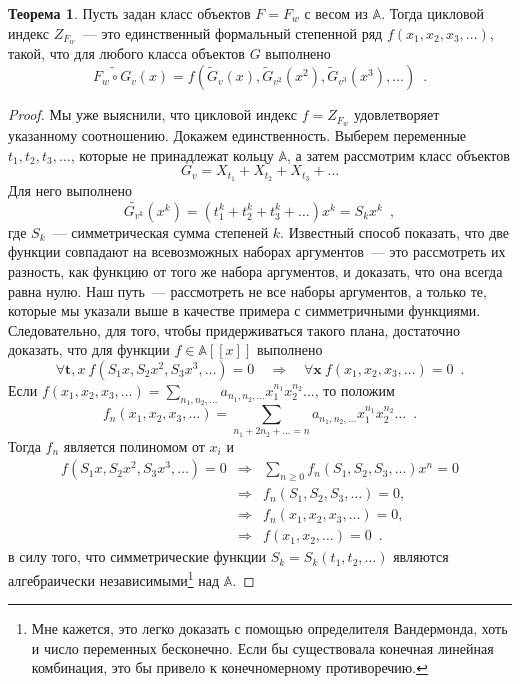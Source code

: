 \documentclass{article}
\def \vec {\boldsymbol}
\theoremstyle{definition}
\newtheorem*{theorem}{Теорема}
\begin{document}
\begin{theorem}
    Пусть задан класс объектов \( F = F_w \) с весом из \( \mathbb A \). Тогда цикловой индекс \( Z_{F_w} \)~--- это
единственный формальный степенной ряд \( f(x_1, x_2, x_3, \ldots) \), такой, что
для любого класса объектов \( G \) выполнено
\[
    \widetilde{F_w \circ G_v}(x) = f(\widetilde G_v(x), \widetilde G_{v^2}(x^2), \widetilde
G_{v^3}(x^3), \ldots) \enspace .
\] 
\end{theorem}
\begin{proof}
    Мы уже выяснили, что цикловой индекс \( f = Z_{F_w} \) удовлетворяет
указанному соотношению. Докажем единственность. Выберем переменные \( t_1, t_2,
t_3, \ldots \), которые не принадлежат кольцу \( \mathbb A \), а затем
рассмотрим класс объектов
\[
    G_v = X_{t_1} + X_{t_2} + X_{t_3} + \ldots
\]
Для него выполнено
\[
    \widetilde{G_{v^k}}(x^k) = (t_1^k + t_2^k + t_3^k + \ldots) x^k = S_k x^k
\enspace ,
\]
где \( S_k \)~--- симметрическая сумма степеней \( k \).
Известный способ показать, что две функции совпадают на всевозможных наборах
аргументов~--- это рассмотреть их разность, как функцию от того же набора
аргументов, и доказать, что она всегда равна нулю. Наш путь~--- рассмотреть не
все наборы аргументов, а только те, которые мы указали выше в качестве примера с
симметричными функциями. Следовательно, для того, чтобы придерживаться такого
плана, достаточно доказать,
что для функции \( f \in \mathbb A [ [ x ] ] \) выполнено
\[
    \forall \vec t, x \ 
    f(S_1 x, S_2 x^2, S_3 x^3, \ldots ) = 0 \quad 
    \Rightarrow \quad
    \forall \vec x\ 
    f(x_1, x_2, x_3, \ldots) = 0 \enspace .
\]
Если \( f(x_1, x_2, x_3, \ldots) = \sum_{n_1, n_2, \ldots} a_{n_1,n_2, \ldots}
x_1^{n_1} x_2^{n_2} \ldots \), то положим
\[
    f_n(x_1, x_2, x_3, \ldots) = \sum_{n_1 + 2n_2 + \ldots = n}
    a_{n_1, n_2, \ldots} x_1^{n_1} x_2^{n_2} \ldots \enspace .
\] 
Тогда \( f_n \) является полиномом от \( x_i \) и 
\begin{eqnarray*}
    f(S_1 x, S_2 x^2, S_3 x^3, \ldots) = 0 & \Rightarrow & 
    \sum_{n \geq 0} f_n(S_1, S_2, S_3, \ldots) x^n = 0\\
    & \Rightarrow & f_n(S_1, S_2, S_3, \ldots) = 0 , \\
    & \Rightarrow & f_n(x_1, x_2, x_3, \ldots) = 0, \\
    & \Rightarrow & f(x_1, x_2, \ldots) = 0 \enspace .
\end{eqnarray*}
в силу того, что симметрические функции \( S_k = S_k(t_1, t_2, \ldots) \)
являются алгебраически независимыми\footnote{Мне кажется, это легко доказать с
помощью определителя Вандермонда, хоть и число переменных бесконечно. Если бы
существовала конечная линейная комбинация, это бы привело к конечномерному
противоречию.} над \( \mathbb A \). 
\end{proof}
\end{document}
